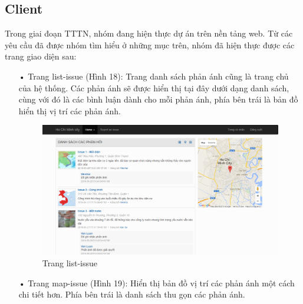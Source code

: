 \documentclass[a4paper]{article}
\begin{document}
\subsection{Client}
Trong giai đoạn TTTN, nhóm đang hiện thực dự án trên nền tảng web. Từ các yêu cầu đã được nhóm tìm hiểu ở những mục trên, nhóm đã hiện thực được các trang giao diện sau:
\newpage
\begin{itemize}
	\item[•]Trang list-issue (Hình 18): Trang danh sách phản ánh cũng là trang chủ của hệ thống. Các phản ánh sẽ được hiển thị tại đây dưới dạng danh sách, cùng với đó là các bình luận dành cho mỗi phản ánh, phía bên trái là bản đồ hiển thị vị trí các phản ánh.
	\begin{center}
    	\begin{figure}[h]
    	\begin{center}
    	 	\includegraphics[scale=.35]{list-issue.PNG}
    	\end{center}
    	\caption{Trang list-issue}
    	\label{refhinh1}
    	\end{figure}
    \end{center}
	\item[•]Trang map-issue (Hình 19): Hiển thị bản đồ vị trí các phản ánh một cách chi tiết hơn. Phía bên trái là danh sách thu gọn các phản ánh.
    

\end{itemize}
\end{document}
